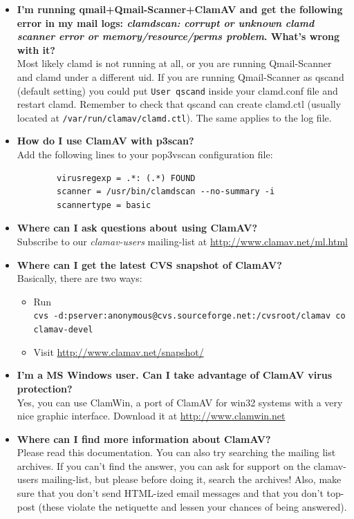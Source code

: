 \documentclass[a4paper,titlepage,12pt]{article}
\begin{document}
\begin{itemize}
	\item \textbf{I'm running qmail+Qmail-Scanner+ClamAV and get the
	following error in my mail logs: \emph{clamdscan: corrupt or unknown
	clamd scanner error or memory/resource/perms problem}. What's wrong
	with it?}\\
	Most likely clamd is not running at all, or you are running
	Qmail-Scanner and clamd under a different uid. If you are running
	Qmail-Scanner as qscand (default setting) you could put
	\verb+User qscand+ inside your clamd.conf file and restart clamd.
	Remember to check that qscand can create clamd.ctl (usually located at
	\verb+/var/run/clamav/clamd.ctl+). The same applies to the log file.

	\item \textbf{How do I use ClamAV with p3scan?}\\
	Add the following lines to your pop3vscan configuration file:
	\begin{verbatim}
	    virusregexp = .*: (.*) FOUND
	    scanner = /usr/bin/clamdscan --no-summary -i
	    scannertype = basic
	\end{verbatim}

	\item \textbf{Where can I ask questions about using ClamAV?}\\
	Subscribe to our \emph{clamav-users} mailing-list at
	\url{http://www.clamav.net/ml.html}

	\item \textbf{Where can I get the latest CVS snapshot of ClamAV?}\\
	Basically, there are two ways:
	\begin{itemize}
	    \item Run\\
	    \verb+cvs -d:pserver:anonymous@cvs.sourceforge.net:/cvsroot/clamav co clamav-devel+
	    \item Visit \url{http://www.clamav.net/snapshot/}
	\end{itemize}

	\item \textbf{I'm a MS Windows user. Can I take advantage of ClamAV
	virus protection?}\\
	Yes, you can use ClamWin, a port of ClamAV for win32 systems with a
	very nice graphic interface. Download it at \url{http://www.clamwin.net}

	\item \textbf{Where can I find more information about ClamAV?}\\
	Please read this documentation. You can also try searching the mailing
	list archives. If you can't find the answer, you can ask for support on
	the clamav-users mailing-list, but please before doing it, search the
	archives! Also, make sure that you don't send HTML-ized email messages
	and that you don't top-post (these violate the netiquette and lessen
	your chances of being answered).


\end{itemize}
\end{document}
